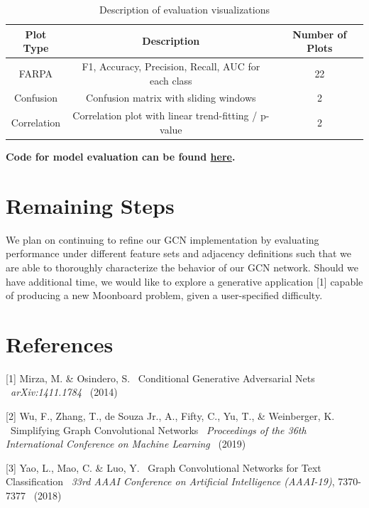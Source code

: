 \documentclass{article}
\begin{document}
\begin{table}[h!]
	\begin{center}
		\begin{tabular}{c|c|c}
		\textbf{Plot Type} & \textbf{Description} & \textbf{Number of Plots}\\	
		\hline
		FARPA & F1, Accuracy, Precision, Recall, AUC for each class & 22\\
		Confusion & Confusion matrix with sliding windows & 2\\
		Correlation & Correlation plot with linear trend-fitting / p-value & 2\\
		\end{tabular}
	\vspace{0.01cm}
	\caption{Description of evaluation visualizations}
	\end{center}
\end{table}

{\small\textbf{Code for model evaluation can be found \href{https://github.com/gestalt-howard/moonGen/blob/master/howard/models_baseline/model_utils/evaluation_tools.py}{here}.}}

\section{Remaining Steps}
We plan on continuing to refine our GCN implementation by evaluating performance under different feature sets and adjacency definitions such that we are able to thoroughly characterize the behavior of our GCN network. Should we have additional time, we would like to explore a generative application [1] capable of producing a new Moonboard problem, given a user-specified difficulty.

\section*{References}
\medskip
\small

[1] Mirza, M. \& Osindero, S. \ Conditional Generative Adversarial Nets \ {\it arXiv:1411.1784} \ (2014)

[2] Wu, F., Zhang, T., de Souza Jr., A., Fifty, C., Yu, T., \& Weinberger, K. \ Simplifying Graph Convolutional Networks \ {\it Proceedings of the 36th International Conference on Machine Learning} \ (2019)

[3] Yao, L., Mao, C. \& Luo, Y. \ Graph Convolutional Networks for Text Classification \ {\it 33rd AAAI Conference on Artificial Intelligence (AAAI-19)}, 7370-7377 \ (2018)
\end{document}

